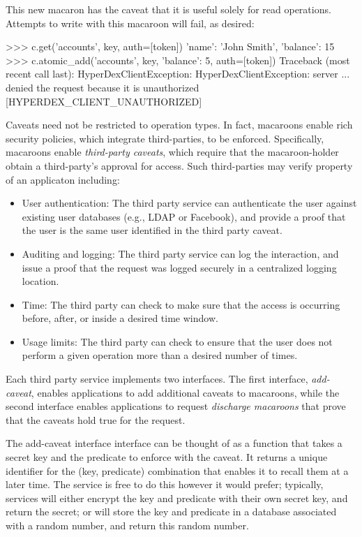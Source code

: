 This new macaron has the caveat that it is useful solely for read operations. 
Attempts to write with this macaroon will fail, as desired:

\begin{pythoncode}
>>> c.get('accounts', key, auth=[token])
{'name': 'John Smith', 'balance': 15}
>>> c.atomic_add('accounts', key, {'balance': 5}, auth=[token])
Traceback (most recent call last):
HyperDexClientException: HyperDexClientException: server ... denied the request because it is unauthorized [HYPERDEX_CLIENT_UNAUTHORIZED]
\end{pythoncode}

Caveats need not be restricted to operation types. In fact, macaroons enable
rich security policies, which integrate third-parties, to be enforced. 
Specifically, macaroons enable {\em third-party caveats}, which require that
the macaroon-holder obtain a third-party's approval for access. 
Such third-parties may verify property of an applicaton including:

\begin{itemize}
    \item User authentication:  The third party service can authenticate the
        user against existing user databases (e.g., LDAP or Facebook), and
        provide a proof that the user is the same user identified in the third
        party caveat.
    \item Auditing and logging:  The third party service can log the
        interaction, and issue a proof that the request was logged securely in a
        centralized logging location.
    \item Time: The third party can check to make sure that the access is 
        occurring before, after, or inside a desired time window.
    \item Usage limits: The third party can check to ensure that the user
        does not perform a given operation more than a desired number of 
        times. 
\end{itemize}

Each third party service implements two interfaces.  The first interface, {\em
add-caveat}, enables applications to add additional caveats to macaroons, while
the second interface enables applications to request {\em discharge macaroons} that
prove that the caveats hold true for the request.

The add-caveat interface interface can be thought of as a function that takes a
secret key and the predicate to
enforce with the caveat.  It returns a unique identifier for the (key,
predicate) combination that enables it to recall them at a later time.  The
service is free to do this however it would prefer; typically, services will
either encrypt the key and predicate with their own secret key, and return the
secret; or will store the key and predicate in a database associated with a
random number, and return this random number.

